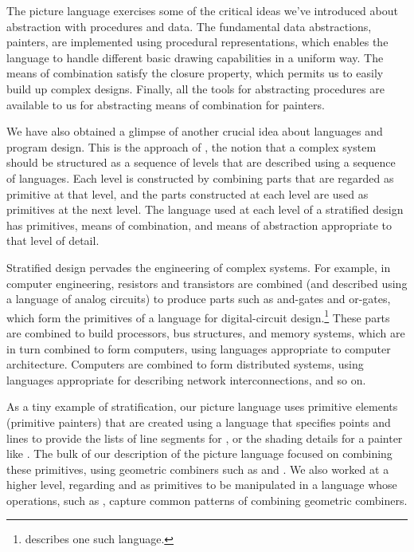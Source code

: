 The picture language exercises some of the critical ideas we've introduced
about abstraction with procedures and data.  The fundamental data abstractions,
painters, are implemented using procedural representations, which enables the
language to handle different basic drawing capabilities in a uniform way.  The
means of combination satisfy the closure property, which permits us to easily
build up complex designs.  Finally, all the tools for abstracting procedures
are available to us for abstracting means of combination for painters.

We have also obtained a glimpse of another crucial idea about languages and
program design.  This is the approach of , the
notion that a complex system should be structured as a sequence of levels that
are described using a sequence of languages.  Each level is constructed by
combining parts that are regarded as primitive at that level, and the parts
constructed at each level are used as primitives at the next level.  The
language used at each level of a stratified design has primitives, means of
combination, and means of abstraction appropriate to that level of detail.

Stratified design pervades the engineering of complex systems.  For example, in
computer engineering, resistors and transistors are combined (and described
using a language of analog circuits) to produce parts such as and-gates and
or-gates, which form the primitives of a language for digital-circuit
design.\footnote{ describes one such language.} These parts
are combined to build processors, bus structures, and memory systems, which are
in turn combined to form computers, using languages appropriate to computer
architecture.  Computers are combined to form distributed systems, using
languages appropriate for describing network interconnections, and so on.

As a tiny example of stratification, our picture language uses primitive
elements (primitive painters) that are created using a language that specifies
points and lines to provide the lists of line segments for
, or the shading details for a painter like
.  The bulk of our description of the picture language focused on
combining these primitives, using geometric combiners such as  and
.  We also worked at a higher level, regarding  and
 as primitives to be manipulated in a language whose operations,
such as , capture common patterns of combining geometric
combiners.

